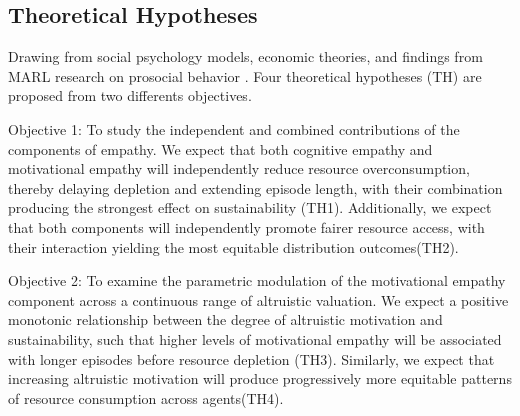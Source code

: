 
\subsection{Theoretical Hypotheses}
Drawing from social psychology models, economic theories\cite{lynneTheoreticalFoundationEmpathy2016,thiermannMotivatingIndividualsSocial2020}, and findings from MARL research on prosocial behavior \cite{yuEmotionalMultiagentReinforcement2015}.
Four theoretical hypotheses (TH) are proposed from two differents objectives.

Objective 1: To study the independent and combined contributions of the components of empathy. We expect that both cognitive empathy and motivational empathy will independently reduce resource overconsumption, thereby delaying depletion and extending episode length, with their combination producing the strongest effect on sustainability (TH1). Additionally, we expect that both components will independently promote fairer resource access, with their interaction yielding the most equitable distribution outcomes(TH2).

Objective 2: To examine the parametric modulation of the motivational empathy component across a continuous range of altruistic valuation. We expect a positive monotonic relationship between the degree of altruistic motivation and sustainability, such that higher levels of motivational empathy will be associated with longer episodes before resource depletion (TH3). Similarly, we expect that increasing altruistic motivation will produce progressively more equitable patterns of resource consumption across agents(TH4).



